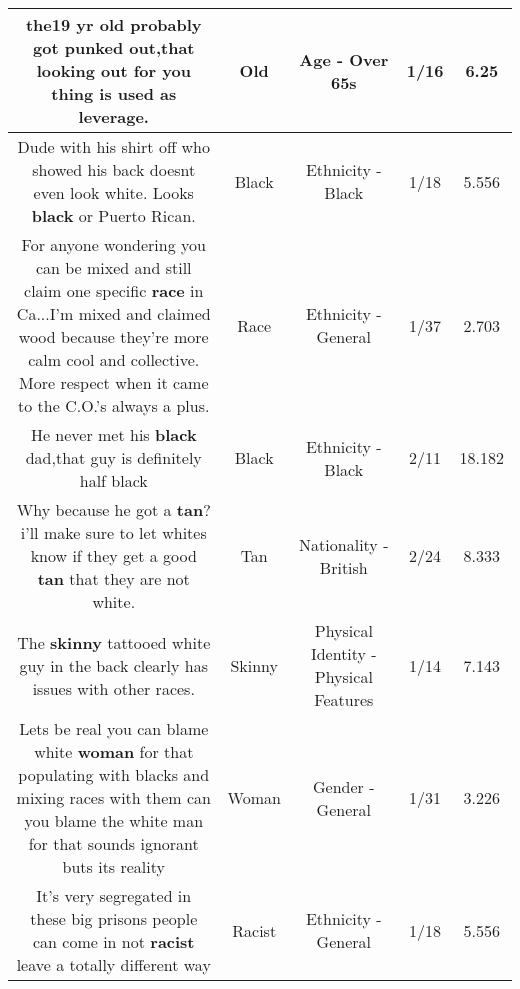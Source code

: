 \documentclass[11pt]{article}
\newlength\mylength
\begin{document}
\begin{center}
\begin{longtable}{|C{.65\mylength}|C{.30\mylength}|C{.12\mylength}|C{.12\mylength}|C{.12\mylength}|}
  \small the19  yr \textbf{old} probably got punked out,that looking out for you thing is used as leverage.\normalsize   & Old & Age - Over 65s & 1/16 & 6.25 \\  \hline
  \small Dude with his shirt off who showed his back doesnt even look white. Looks \textbf{black} or Puerto Rican.\normalsize   & Black & Ethnicity - Black & 1/18 & 5.556 \\  \hline
  \small For anyone wondering you can be mixed and still claim one specific \textbf{race} in Ca...I'm mixed and claimed wood because they're more calm cool and collective.  More respect when it came to the C.O.'s always a plus.\normalsize   & Race & Ethnicity - General & 1/37 & 2.703 \\  \hline
  \small He never met his \textbf{black} dad,that guy is definitely half black\normalsize   & Black & Ethnicity - Black & 2/11 & 18.182 \\  \hline
  \small Why because he got a \textbf{tan}?  i'll make sure to let whites know if they get a good \textbf{tan} that they are not white.\normalsize   & Tan & Nationality - British & 2/24 & 8.333 \\  \hline
  \small The \textbf{skinny} tattooed white guy in the back clearly has issues with other races.\normalsize   & Skinny & Physical Identity - Physical Features & 1/14 & 7.143 \\  \hline
  \small Lets be real you can blame white \textbf{woman} for that populating with blacks and mixing races with them can you blame the white man for that sounds ignorant buts its reality\normalsize   & Woman & Gender - General & 1/31 & 3.226 \\  \hline
  \small It's very segregated in these big prisons people can come in not \textbf{racist} leave a totally different way\normalsize   & Racist & Ethnicity - General & 1/18 & 5.556 \\  \hline

\end{longtable}
\end{center}
\end{document}
